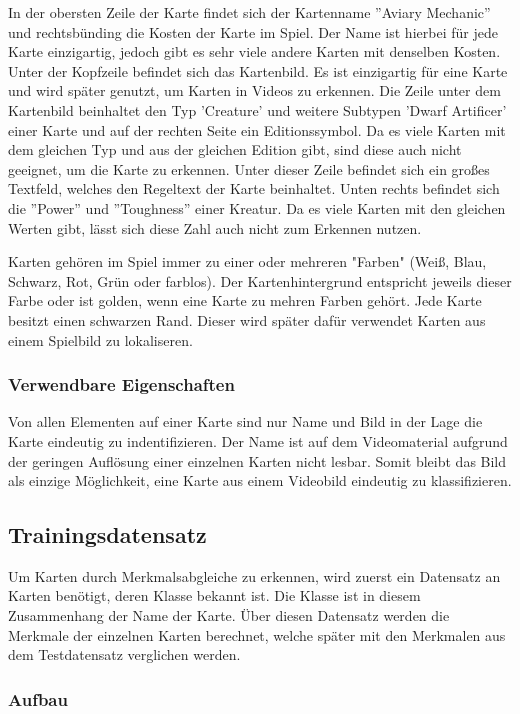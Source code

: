 In der obersten Zeile der Karte findet sich der Kartenname  ''Aviary Mechanic'' und rechtsbünding die Kosten der Karte im Spiel. Der Name ist hierbei für jede Karte einzigartig, jedoch gibt es sehr viele andere Karten mit denselben Kosten.
Unter der Kopfzeile befindet sich das Kartenbild. Es ist einzigartig für eine Karte und wird später genutzt, um Karten in Videos zu erkennen.
Die Zeile unter dem Kartenbild beinhaltet den Typ 'Creature' und weitere Subtypen 'Dwarf Artificer' einer Karte und auf der rechten Seite ein Editionssymbol. Da es viele Karten mit dem gleichen Typ und aus der gleichen Edition gibt, sind diese auch nicht geeignet, um die Karte zu erkennen.
Unter dieser Zeile befindet sich ein großes Textfeld, welches den Regeltext der Karte beinhaltet.
Unten rechts befindet sich die ''Power'' und ''Toughness'' einer Kreatur. Da es viele Karten mit den gleichen Werten gibt, lässt sich diese Zahl auch nicht zum Erkennen nutzen.

Karten gehören im Spiel immer zu einer oder mehreren "Farben" (Weiß, Blau, Schwarz, Rot, Grün oder farblos). Der Kartenhintergrund entspricht jeweils dieser Farbe oder ist golden, wenn eine Karte zu mehren Farben gehört.
Jede Karte besitzt einen schwarzen Rand. Dieser wird später dafür verwendet Karten aus einem Spielbild zu lokaliseren. 

\subsubsection{Verwendbare Eigenschaften}

Von allen Elementen auf einer Karte sind nur Name und Bild in der Lage die Karte eindeutig zu indentifizieren. Der Name ist auf dem Videomaterial aufgrund der geringen Auflösung einer einzelnen Karten nicht lesbar.
Somit bleibt das Bild als einzige Möglichkeit, eine Karte aus einem Videobild eindeutig zu klassifizieren.


\subsection{Trainingsdatensatz}

Um Karten durch Merkmalsabgleiche zu erkennen, wird zuerst ein Datensatz an Karten benötigt, deren Klasse bekannt ist. Die Klasse ist in diesem Zusammenhang der Name der Karte. Über diesen Datensatz werden die Merkmale der einzelnen Karten berechnet, welche später mit den Merkmalen aus dem Testdatensatz verglichen werden.

\subsubsection{Aufbau}

